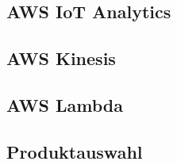 \subsection{AWS IoT Analytics}

\subsection{AWS Kinesis}

\subsection{AWS Lambda}

\subsection{Produktauswahl}